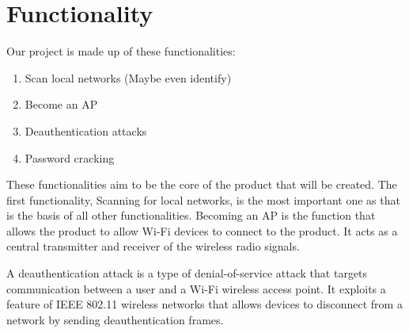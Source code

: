 \section{Functionality}
Our project is made up of these functionalities:
\begin{enumerate}
    \item Scan local networks (Maybe even identify)
    \item Become an AP
    \item Deauthentication attacks
    \item Password cracking
\end{enumerate}

 
These functionalities aim to be the core of the product that will be created. The first functionality, Scanning for local networks, is the most important one as that is the basis of all other functionalities. 
Becoming an AP is the function that allows the product to allow Wi-Fi devices to connect to the product. It acts as a central transmitter and receiver of the wireless radio signals. 

A deauthentication attack is a type of denial-of-service attack that targets communication between a user and a Wi-Fi wireless access point. It exploits a feature of IEEE 802.11 wireless networks that allows devices to disconnect from a network by sending deauthentication frames.

